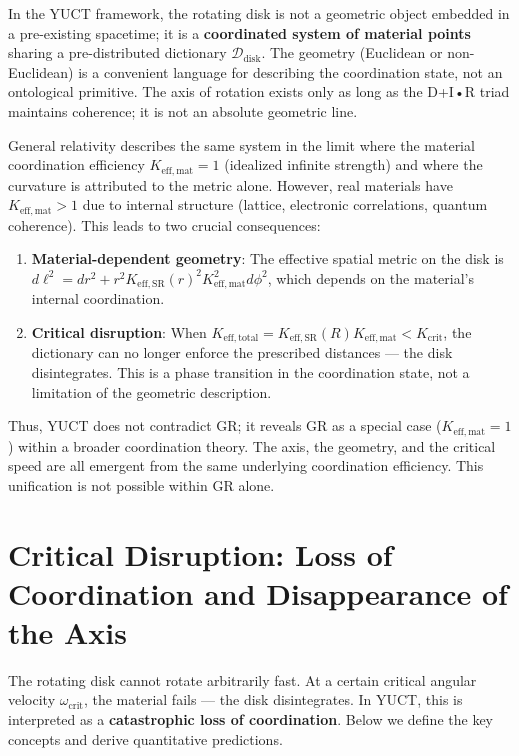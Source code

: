 \documentclass[12pt,a4paper]{article}
\begin{document}
In the YUCT framework, the rotating disk is not a geometric object embedded in a pre-existing spacetime; it is a \textbf{coordinated system of material points} sharing a pre-distributed dictionary \(\mathcal{D}_{\text{disk}}\). The geometry (Euclidean or non-Euclidean) is a convenient language for describing the coordination state, not an ontological primitive. The axis of rotation exists only as long as the D+I•R triad maintains coherence; it is not an absolute geometric line.

General relativity describes the same system in the limit where the material coordination efficiency \(K_{\mathrm{eff,mat}} = 1\) (idealized infinite strength) and where the curvature is attributed to the metric alone. However, real materials have \(K_{\mathrm{eff,mat}} > 1\) due to internal structure (lattice, electronic correlations, quantum coherence). This leads to two crucial consequences:

\begin{enumerate}
	\item \textbf{Material-dependent geometry}: The effective spatial metric on the disk is \(d\ell^2 = dr^2 + r^2 K_{\mathrm{eff,SR}}(r)^2 K_{\mathrm{eff,mat}}^2 d\phi^2\), which depends on the material's internal coordination.
	\item \textbf{Critical disruption}: When \(K_{\mathrm{eff,total}} = K_{\mathrm{eff,SR}}(R) K_{\mathrm{eff,mat}} < K_{\mathrm{crit}}\), the dictionary can no longer enforce the prescribed distances — the disk disintegrates. This is a phase transition in the coordination state, not a limitation of the geometric description.
\end{enumerate}

Thus, YUCT does not contradict GR; it reveals GR as a special case (\(K_{\mathrm{eff,mat}}=1\)) within a broader coordination theory. The axis, the geometry, and the critical speed are all emergent from the same underlying coordination efficiency. This unification is not possible within GR alone.
	
	\section{Critical Disruption: Loss of Coordination and Disappearance of the Axis}
	\label{sec:critical-disruption}
	
	The rotating disk cannot rotate arbitrarily fast. At a certain critical angular velocity \(\omega_{\text{crit}}\), the material fails — the disk disintegrates. In YUCT, this is interpreted as a \textbf{catastrophic loss of coordination}. Below we define the key concepts and derive quantitative predictions.
	
\end{document}
